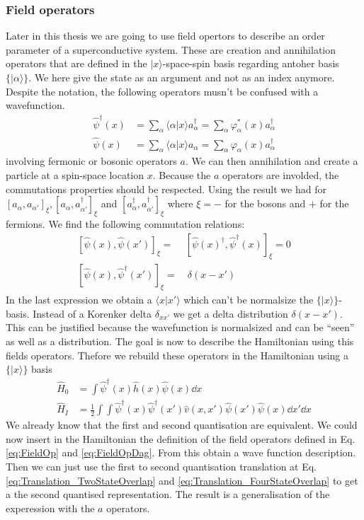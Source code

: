 \documentclass[../main.tex]{subfile}
\begin{document}
\subsubsection{Field operators}
Later in this thesis we are going to use field opertors to describe an order parameter of a superconductive system. These are 
creation and annihilation operators that are defined in the $|x\rangle$-space-spin basis regarding antoher basis $\{|\alpha\rangle\}$. We here give the state as an argument
and not as an index anymore. Despite the notation, the following operators musn't be confused with a wavefunction.
\begin{align}
    \hat{\psi}^{\dagger}(x) &= \sum_{\alpha} \langle\alpha|x\rangle a_{\alpha}^{\dagger} = \sum_{\alpha} \varphi_{\alpha}^{\ast}(x) a_{\alpha}^{\dagger} \label{eq:FieldOp}\\ 
    \hat{\psi}(x) &= \sum_{\alpha} \langle\alpha|x\rangle a_{\alpha} = \sum_{\alpha} \varphi_{\alpha}(x) a_{\alpha}^{\dagger}\label{eq:FieldOpDag}
\end{align}
involving fermonic or bosonic operators $a$. We can then annihilation and create a particle at a spin-space location $x$. Because the $a$ operators
are involded, the commutations properties should be respected. Using the result we had for $[a_{\alpha}, a_{\alpha'}]_{\xi},
[a_{\alpha}, a_{\alpha'}^{\dagger}]_{\xi}$ and $[a_{\alpha}^{\dagger}, a_{\alpha'}^{\dagger}]_{\xi}$ where $\xi = -$ for the bosons and $+$ for the fermions. We find the following commutation relations:
\begin{align*}
    \left[\hat{\psi}(x), \hat{\psi}(x')\right]_{\xi} = & \left[\hat{\psi}(x)^{\dagger}, \hat{\psi}^{\dagger}(x)\right]_{\xi} = 0 \\
    \left[\hat{\psi}(x), \hat{\psi}^{\dagger}(x')\right]_{\xi} = &~ \delta(x-x')
\end{align*}
In the last expression we obtain a $\langle x | x '\rangle$ which can't be normalsize the $\{|x\rangle\}$-basis. Instead of a Korenker delta $\delta_{xx'}$
we get a delta distribution $\delta(x-x')$. This can be justified because the wavefunction is normalsized and can be ``seen'' as well as a distribution.
The goal is now to describe the Hamiltonian using this fields operators. Thefore we rebuild these operators in the Hamiltonian using a $\{|x\rangle\}$ basis
\begin{align*}
    \hat{H}_0 &=  \int \hat{\psi}^{\dagger}(x) \hat{h}(x)\hat{\psi}(x) \dd x\\
    \hat{H}_I &= \frac{1}{2} \int \int  \hat{\psi}^{\dagger}(x) \hat{\psi}^{\dagger}(x') \hat{v}(x,x')\hat{\psi}(x') \hat{\psi}(x) \dd x' \dd x
\end{align*}
We already know that the first and second quantisation are equivalent. We could now insert in the Hamiltonian the definition of the field operators defined in Eq.\ref{eq:FieldOp} and \ref{eq:FieldOpDag}.
From this obtain a wave function description. Then we can just use the first to second quantisation translation at Eq.\ref{eq:Translation_TwoStateOverlap} and \ref{eq:Translation_FourStateOverlap}
to get a the second quantised representation. The result is a generalisation of the experession with the $a$ operators.\\
\end{document}
